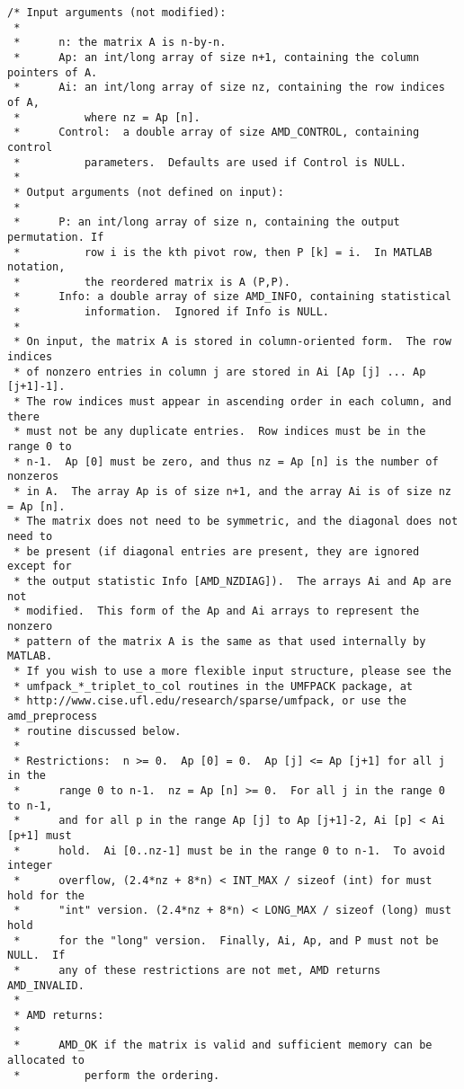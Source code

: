 \documentclass[11pt]{article}
\begin{document}
{\begin{verbatim}
/* Input arguments (not modified):
 *
 *      n: the matrix A is n-by-n.
 *      Ap: an int/long array of size n+1, containing the column pointers of A.
 *      Ai: an int/long array of size nz, containing the row indices of A,
 *          where nz = Ap [n].
 *      Control:  a double array of size AMD_CONTROL, containing control
 *          parameters.  Defaults are used if Control is NULL.
 *
 * Output arguments (not defined on input):
 *
 *      P: an int/long array of size n, containing the output permutation. If
 *          row i is the kth pivot row, then P [k] = i.  In MATLAB notation,
 *          the reordered matrix is A (P,P).
 *      Info: a double array of size AMD_INFO, containing statistical
 *          information.  Ignored if Info is NULL.
 *
 * On input, the matrix A is stored in column-oriented form.  The row indices
 * of nonzero entries in column j are stored in Ai [Ap [j] ... Ap [j+1]-1].
 * The row indices must appear in ascending order in each column, and there
 * must not be any duplicate entries.  Row indices must be in the range 0 to
 * n-1.  Ap [0] must be zero, and thus nz = Ap [n] is the number of nonzeros
 * in A.  The array Ap is of size n+1, and the array Ai is of size nz = Ap [n].
 * The matrix does not need to be symmetric, and the diagonal does not need to
 * be present (if diagonal entries are present, they are ignored except for
 * the output statistic Info [AMD_NZDIAG]).  The arrays Ai and Ap are not
 * modified.  This form of the Ap and Ai arrays to represent the nonzero
 * pattern of the matrix A is the same as that used internally by MATLAB.
 * If you wish to use a more flexible input structure, please see the
 * umfpack_*_triplet_to_col routines in the UMFPACK package, at
 * http://www.cise.ufl.edu/research/sparse/umfpack, or use the amd_preprocess
 * routine discussed below.
 *
 * Restrictions:  n >= 0.  Ap [0] = 0.  Ap [j] <= Ap [j+1] for all j in the
 *      range 0 to n-1.  nz = Ap [n] >= 0.  For all j in the range 0 to n-1,
 *      and for all p in the range Ap [j] to Ap [j+1]-2, Ai [p] < Ai [p+1] must
 *      hold.  Ai [0..nz-1] must be in the range 0 to n-1.  To avoid integer
 *      overflow, (2.4*nz + 8*n) < INT_MAX / sizeof (int) for must hold for the
 *      "int" version. (2.4*nz + 8*n) < LONG_MAX / sizeof (long) must hold
 *      for the "long" version.  Finally, Ai, Ap, and P must not be NULL.  If
 *      any of these restrictions are not met, AMD returns AMD_INVALID.
 *
 * AMD returns:
 *
 *      AMD_OK if the matrix is valid and sufficient memory can be allocated to
 *          perform the ordering.

\end{verbatim}}
\end{document}
